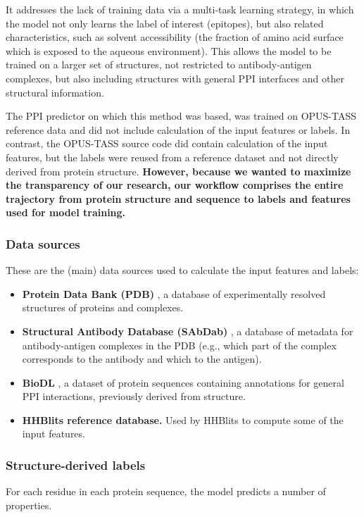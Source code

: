 It addresses the lack of training data via a multi-task learning strategy, in which the model not only learns the label of interest (epitopes), but also related characteristics, such as solvent accessibility (the fraction of amino acid surface which is exposed to the aqueous environment). This allows the model to be trained on a larger set of structures, not restricted to antibody-antigen complexes, but also including structures with general PPI interfaces and other structural information.

The PPI predictor on which this method was based, was trained on OPUS-TASS reference data and did not include calculation of the input features or labels. In contrast, the OPUS-TASS source code did contain calculation of the input features, but the labels were reused from a reference dataset and not directly derived from protein structure. \textbf{However, because we wanted to maximize the transparency of our research, our workflow comprises the entire trajectory from protein structure and sequence to labels and features used for model training.} 

\subsubsection{Data sources}
These are the (main) data sources used to calculate the input features and labels:

\begin{itemize}
    \item \textbf{Protein Data Bank (PDB)} \cite{bermanProteinDataBank2000}, a database of experimentally resolved structures of proteins and complexes.
    \item \textbf{Structural Antibody Database (SAbDab)} \cite{dunbarSAbDabStructuralAntibody2014},  a database of metadata for antibody-antigen complexes in the PDB (e.g., which part of the complex corresponds to the antibody and which to the antigen).
    \item \textbf{BioDL} \cite{stringerPIPENNProteinInterface2022}, a dataset of protein sequences containing annotations for general PPI interactions, previously derived from structure.
    \item \textbf{HHBlits reference database.} Used by HHBlits \cite{remmertHHblitsLightningfastIterative2012} to compute some of the input features.
\end{itemize}

\subsubsection{Structure-derived labels}
For each residue in each protein sequence, the model predicts a number of properties. 

